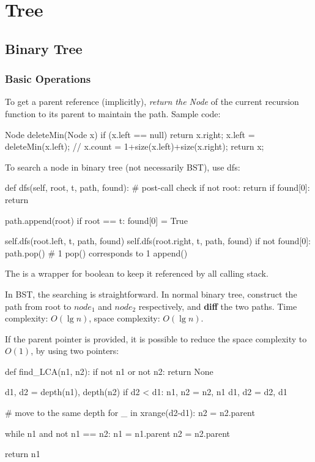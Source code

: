 \chapter{Tree}

\section{Binary Tree}
\subsection{Basic Operations}
 To get a parent reference (implicitly), \textit{return the Node} of the current recursion function to its parent to maintain the path. Sample code:
\begin{java}
Node deleteMin(Node x) {
    if (x.left == null) return x.right;
    x.left = deleteMin(x.left);
    // x.count = 1+size(x.left)+size(x.right);
    return x;
}
\end{java}
 To search a node in binary tree (not necessarily BST), use dfs:
\begin{python}
def dfs(self, root, t, path, found):
    # post-call check
    if not root: return        
    if found[0]: return 

    path.append(root)
    if root == t:
        found[0] = True

    self.dfs(root.left, t, path, found)
    self.dfs(root.right, t, path, found)
    if not found[0]:
        path.pop()  # 1 pop() corresponds to 1 append()
\end{python}
The  is a wrapper for boolean to keep it referenced by all calling stack. 

 In BST, the searching is straightforward. In normal binary tree, construct the path from root to $node_1$ and $node_2$ respectively, and \textbf{diff} the two paths. Time complexity: $O(\lg n)$, space complexity: $O(\lg n)$. 

If the parent pointer is provided, it is possible to reduce the space complexity to $O(1)$, by using two pointers: 
\begin{python}
def find_LCA(n1, n2):
    if not n1 or not n2:
        return None 
        
    d1, d2 = depth(n1), depth(n2)
    if d2 < d1:
        n1, n2 = n2, n1
        d1, d2 = d2, d1
        
    # move to the same depth 
    for _ in xrange(d2-d1):
        n2 = n2.parent  

    while n1 and not n1 == n2:  
        n1 = n1.parent
        n2 = n2.parent
        
    return n1
\end{python}

